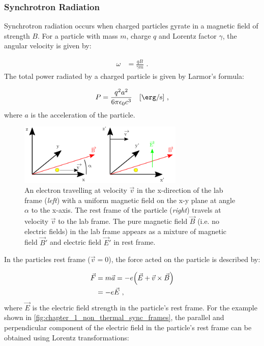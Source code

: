\subsubsection{Synchrotron Radiation}

Synchrotron radiation occurs when charged particles gyrate in a magnetic field of strength $B$. For a particle with mass $m$, charge $q$ and Lorentz factor $\gamma$, the angular velocity is given by:

\begin{equation}
    \begin{aligned}
    	\omega &=\frac{qB}{\gamma m}\text{ .}
    \end{aligned}
\end{equation}
\noindent The total power radiated by a charged particle is given by Larmor's formula:

\begin{equation}
    \begin{aligned}
    P=\frac{q^2a^2}{6\pi\epsilon_0c^3}\quad\qty[\si{\ergs\per\second}]\text{ ,}
    \end{aligned}
\end{equation}
\noindent where $a$ is the acceleration of the particle.

\begin{figure}[h!]
	\centering
	\includegraphics[width=0.7\textwidth]{04_Introduction/Images/non_thermal_emission/synchrotron_frames.pdf}
	\caption {An electron travelling at velocity $\vec{v}$ in the x-direction of the lab frame (\textit{left}) with a uniform magnetic field on the x-y plane at angle $\alpha$ to the x-axis. The rest frame of the particle (\textit{right}) travels at velocity $\vec{v}$ to the lab frame. The pure magnetic field $\vec{B}$ (i.e. no electric fields) in the lab frame appears as a mixture of magnetic field $\vec{B}'$ and electric field $\vec{E}'$ in rest frame.}
	\label{fig:chapter_1_non_thermal_sync_frames}
\end{figure}
\newpar 
In the particles rest frame ($\vec{v}=0$), the force acted on the particle is described by:

\begin{equation}
	\begin{split}
		\vec{F}&=m\vec{a}=-e\qty(\vec{E}+\vec{v}\times \vec{B})  \\
		&=-e\vec{E}\text{ ,}
	\end{split}
\end{equation}
where $\vec{E}$ is the electric field strength in the particle's rest frame. For the example shown in \autoref{fig:chapter_1_non_thermal_sync_frames}, the parallel and perpendicular component of the electric field in the particle's rest frame can be obtained using Lorentz transformations:

